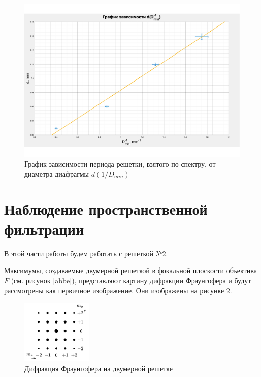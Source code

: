 \documentclass[a4paper,12pt]{article}
\begin{document}
\begin{center}
	\begin{figure}[hbt!]
		\centering
		\includegraphics[width=\linewidth]{gr1.pdf}
		\caption{График зависимости периода решетки, взятого по спектру, от диаметра диафрагмы $d(1/D_{min})$}
		\label{oops}
	\end{figure}
\end{center}

\section*{Наблюдение пространственной фильтрации}

В этой части работы будем работать с решеткой №2.

Максимумы, создаваемые двумерной решеткой в фокальной плоскости объектива $F$ (см. рисунок \ref{abbe}), представляют картину дифракции Фраунгофера и будут рассмотрены как первичное изображение. Они изображены на рисунке \ref{2d}.

\begin{figure}[h]
	\centering	
	\includegraphics[width=0.3\textwidth]{2d.png}
	\caption{Дифракция Фраунгофера на двумерной решетке}
	\label{2d}
\end{figure}
\end{document}

